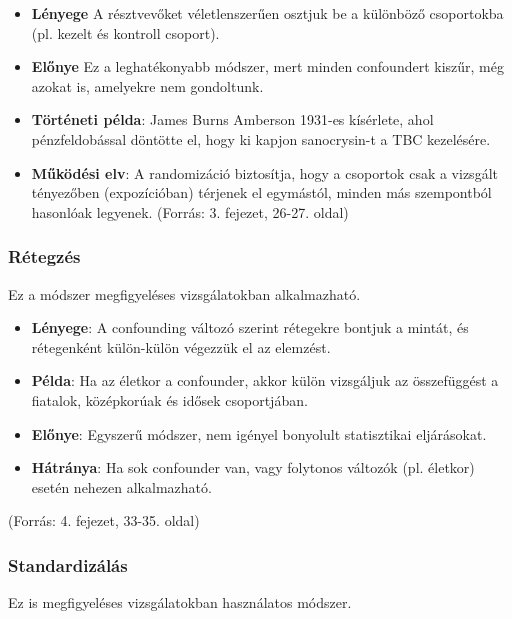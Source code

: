\documentclass[a4paper,12pt]{article}
\begin{document}
\begin{itemize}
\item \textbf{Lényege}
A résztvevőket véletlenszerűen osztjuk be a különböző csoportokba (pl. kezelt és kontroll csoport).

\item \textbf{Előnye}
Ez a leghatékonyabb módszer, mert minden confoundert kiszűr, még azokat is, amelyekre nem gondoltunk.

\item \textbf{Történeti példa}:
James Burns Amberson 1931-es kísérlete, ahol pénzfeldobással döntötte el, hogy ki kapjon sanocrysin-t a TBC kezelésére.

\item \textbf{Működési elv}: 
A randomizáció biztosítja, hogy a csoportok csak a vizsgált tényezőben (expozícióban) térjenek el egymástól, minden más szempontból hasonlóak legyenek.
(Forrás: 3. fejezet, 26-27. oldal)

\end{itemize}

\subsubsection{Rétegzés}

Ez a módszer megfigyeléses vizsgálatokban alkalmazható.

\begin{itemize}
\item \textbf{Lényege}: A confounding változó szerint rétegekre bontjuk a mintát, és rétegenként külön-külön végezzük el az elemzést.
\item \textbf{Példa}: Ha az életkor a confounder, akkor külön vizsgáljuk az összefüggést a fiatalok, középkorúak és idősek csoportjában.
\item \textbf{Előnye}: Egyszerű módszer, nem igényel bonyolult statisztikai eljárásokat.
\item \textbf{Hátránya}: Ha sok confounder van, vagy folytonos változók (pl. életkor) esetén nehezen alkalmazható.
\end{itemize}
(Forrás: 4. fejezet, 33-35. oldal)

\subsubsection{Standardizálás}

Ez is megfigyeléses vizsgálatokban használatos módszer.
\end{document}
